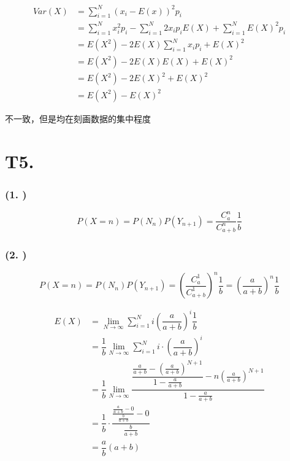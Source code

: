 \documentclass{article}
\newcommand\f[2]{\frac{#1}{#2}}
\newcommand\df[2]{\dfrac{#1}{#2}}
\begin{document}
\begin{equation}
    \begin{aligned}
        Var(X)
        & =\sum_{i=1}^{N}(x_i-E(x))^2p_i\\
        & =\sum_{i=1}^{N}x_i^2p_i-\sum_{i=1}^{N}2x_ip_iE(X)+\sum_{i=1}^{N}E(X)^2p_i\\
        & =E(X^2)-2E(X)\sum_{i=1}^{N}x_ip_i+E(X)^2\\
        & =E(X^2)-2E(X)E(X)+E(X)^2\\
        & =E(X^2)-2E(X)^2+E(X)^2\\
        & =E(X^2)-E(X)^2
    \end{aligned}
\end{equation}

不一致，但是均在刻画数据的集中程度

\section*{T5. }

\subsubsection*{(1. )}

$$P(X=n)=P(N_n)P(Y_{n+1})=\df{C^n_a}{C^n_{a+b}}\df{1}{b}$$

\subsubsection*{(2. )}

$$P(X=n)=P(N_n)P(Y_{n+1})=(\df{C^1_a}{C^1_{a+b}})^n\df{1}{b}=(\df{a}{a+b})^n\df{1}{b}$$

\begin{equation}
    \begin{aligned}
        E(X)
        & =\lim_{N\to \infty}\sum_{i=1}^{N}i(\df{a}{a+b})^i\df{1}{b}\\
        & =\df{1}{b}\lim_{N\to\infty}\sum_{i=1}^{N}i\cdot(\df{a}{a+b})^i\\
        & =\df{1}{b}\lim_{N\to\infty}\df{\df{\f{a}{a+b}-(\f{a}{a+b})^{N+1}}{1-\f{a}{a+b}}-n(\f{a}{a+b})^{N+1}}{1-\f{a}{a+b}}\\
        & =\df{1}{b}\cdot\df{\f{\f{a}{a+b}-0}{\f{b}{a+b}}-0}{\f{b}{a+b}}\\
        & =\df{a}{b}(a+b)
    \end{aligned}
\end{equation}
\end{document}
